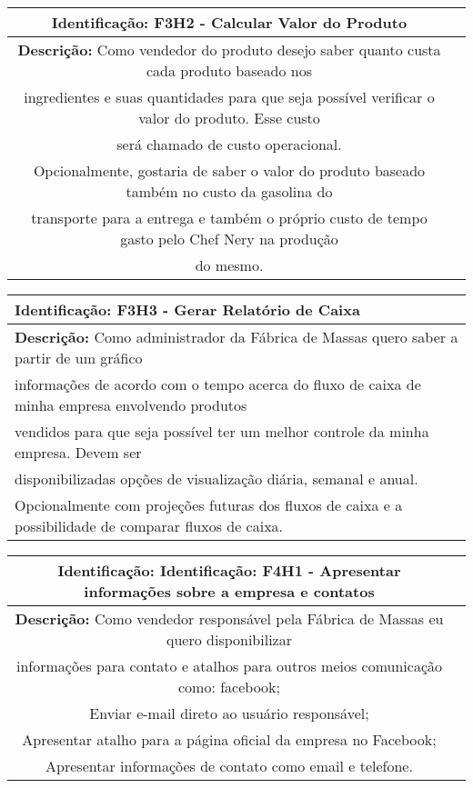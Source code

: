     \begin{table}[H]
    \centering
    \begin{tabular}{|c|p{10cm}}
    \hline
    \textbf{Identificação:} F3H2 - Calcular Valor do Produto    \\
    \hline
    \textbf{Descrição:} Como vendedor do produto desejo saber quanto custa cada produto baseado nos\\
     ingredientes e suas quantidades para que seja possível verificar o valor do produto. Esse custo\\
      será chamado de custo operacional.\\
	Opcionalmente, gostaria de saber o valor do produto baseado também no custo da gasolina do\\
     transporte para a entrega e também o próprio custo de tempo gasto pelo Chef Nery na produção\\
      do mesmo.  \\
    \hline
    \end{tabular}
    \end{table}

    \begin{table}[H]
    \centering
    \begin{tabular}{|p{15cm}|}
    \hline
    \textbf{Identificação:} F3H3 - Gerar Relatório de Caixa \\
    \hline
    \textbf{Descrição:} Como administrador da Fábrica de Massas quero saber a partir de um gráfico\\
     informações de acordo com o tempo acerca do fluxo de caixa de minha empresa envolvendo produtos\\
      vendidos para que seja possível ter um melhor controle da minha empresa. Devem ser\\
       disponibilizadas opções de visualização diária, semanal e anual.\\
Opcionalmente com projeções futuras dos fluxos de caixa e a possibilidade de comparar fluxos de caixa.\\
    \hline
    \end{tabular}
    \end{table}

    \begin{table}[H]
    \centering
    \begin{tabular}{|c|p{10cm}}
    \hline
    \textbf{Identificação:} Identificação: F4H1 - Apresentar informações sobre a empresa e contatos \\
    \hline
    \textbf{Descrição:} Como vendedor responsável pela Fábrica de Massas eu quero disponibilizar\\
     informações para contato e atalhos para outros meios comunicação como:
      facebook; \\
      Enviar e-mail direto ao usuário responsável;\\
      Apresentar atalho para a página oficial da empresa no Facebook;\\
      Apresentar informações de contato como email e telefone.\\
      \hline
    \end{tabular}
    \end{table}
